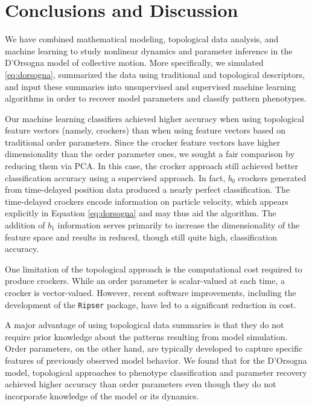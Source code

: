 \documentclass[%
 aip,
reprint,
 amsmath,amssymb,
 aps,
showkeys
]{revtex4-1}
\begin{document}
\section{\label{sec:discussion}Conclusions and Discussion}

We have combined mathematical modeling, topological data analysis, and machine learning to study nonlinear dynamics and parameter inference in the D'Orsogna model of collective motion. More specifically, we simulated \eqref{eq:dorsogna}, summarized the data using traditional and topological descriptors, and input these summaries into unsupervised and supervised machine learning algorithms in order to recover model parameters and classify pattern phenotypes.

Our machine learning classifiers achieved higher accuracy when using topological feature vectors (namely, crockers) than when using feature vectors based on traditional order parameters. Since the crocker feature vectors have higher dimensionality than the order parameter ones, we sought a fair comparison by reducing them via PCA. In this case, the crocker approach still achieved better classification accuracy using a supervised approach. In fact, $b_0$ crockers generated from time-delayed position data produced a nearly perfect classification. The time-delayed crockers encode information on particle velocity, which appears explicitly in Equation \eqref{eq:dorsogna} and may thus aid the algorithm. The addition of $b_1$ information serves primarily to increase the dimensionality of the feature space and results in reduced, though still quite high, classification accuracy.

One limitation of the topological approach is the computational cost required to produce crockers. While an order parameter is scalar-valued at each time, a crocker is vector-valued. However, recent software improvements, including the development of the \texttt{Ripser} package, have led to a significant reduction in cost.  

A major advantage of using topological data summaries is that they do not require prior knowledge about the patterns resulting from model simulation. Order parameters, on the other hand, are typically developed to capture specific features of previously observed model behavior. We found that for the D'Orsogna model, topological approaches to phenotype classification and parameter recovery achieved higher accuracy than order parameters even though they do not incorporate knowledge of the model or its dynamics.
\end{document}
